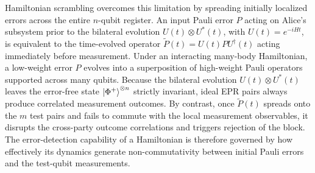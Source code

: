 \documentclass[onecolumn,prx,longbibliography,nofootinbib, superscriptaddress]{revtex4-2}
\theoremstyle{recap}
\begin{document}
Hamiltonian scrambling overcomes this limitation by spreading initially localized errors across the entire $n$-qubit register. An input Pauli error $P$ acting on Alice's subsystem prior to the bilateral evolution $U(t)\otimes U^*(t)$, with $U(t)=e^{-iHt}$, is equivalent to the time-evolved operator $\tilde{P}(t)=U(t)PU^{\dagger}(t)$ acting immediately before measurement. Under an interacting many-body Hamiltonian, a low-weight error $P$ evolves into a superposition of high-weight Pauli operators supported across many qubits. Because the bilateral evolution $U(t)\otimes U^*(t)$ leaves the error-free state $\ket{\Phi^+}^{\otimes n}$ strictly invariant, ideal EPR pairs always produce correlated measurement outcomes. By contrast, once $\tilde{P}(t)$ spreads onto the $m$ test pairs and fails to commute with the local measurement observables, it disrupts the cross-party outcome correlations and triggers rejection of the block. The error-detection capability of a Hamiltonian is therefore governed by how effectively its dynamics generate non-commutativity between initial Pauli errors and the test-qubit measurements.
\end{document}
